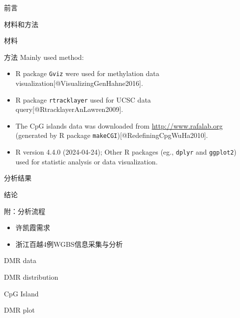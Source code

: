 \documentclass[
  ignorenonframetext,
]{beamer}
\providecommand{\tightlist}{%
  \setlength{\itemsep}{0pt}\setlength{\parskip}{0pt}}
\begin{document}
\begin{frame}{前言}
\protect\hypertarget{introduction}{}
\end{frame}

\begin{frame}[fragile]{材料和方法}
\protect\hypertarget{methods}{}
\begin{block}{材料}
\protect\hypertarget{ux6750ux6599}{}
\end{block}

\begin{block}{方法}
\protect\hypertarget{ux65b9ux6cd5}{}
Mainly used method:

\begin{itemize}
\tightlist
\item
  R package \texttt{Gviz} were used for methylation data
  visualization{[}@VisualizingGenHahne2016{]}.
\item
  R package \texttt{rtracklayer} used for UCSC data
  query{[}@RtracklayerAnLawren2009{]}.
\item
  The CpG islands data was downloaded from \url{http://www.rafalab.org}
  (generated by R package \texttt{makeCGI}){[}@RedefiningCpgWuHa2010{]}.
\item
  R version 4.4.0 (2024-04-24); Other R packages (eg., \texttt{dplyr}
  and \texttt{ggplot2}) used for statistic analysis or data
  visualization.
\end{itemize}
\end{block}
\end{frame}

\begin{frame}{分析结果}
\protect\hypertarget{results}{}
\end{frame}

\begin{frame}{结论}
\protect\hypertarget{dis}{}
\end{frame}

\begin{frame}{附：分析流程}
\protect\hypertarget{workflow}{}
\begin{itemize}
\tightlist
\item
  许凯霞需求
\item
  浙江百越4例WGBS信息采集与分析
\end{itemize}

\begin{block}{DMR data}
\protect\hypertarget{dmr-data}{}
\end{block}

\begin{block}{DMR distribution}
\protect\hypertarget{dmr-distribution}{}
\end{block}

\begin{block}{CpG Island}
\protect\hypertarget{cpg-island}{}
\end{block}

\begin{block}{DMR plot}
\protect\hypertarget{dmr-plot}{}
\end{block}
\end{frame}
\end{document}
